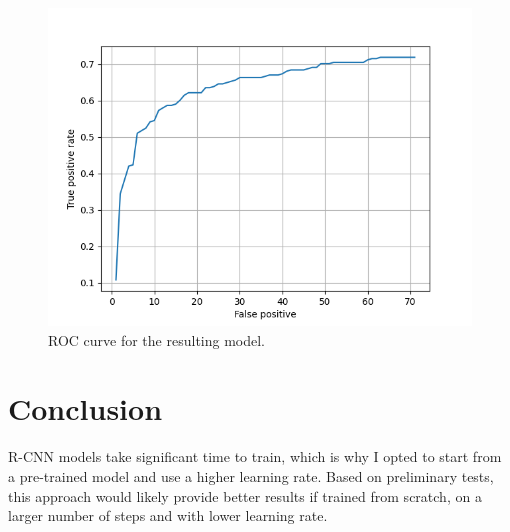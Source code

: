 \documentclass[9pt]{IEEEtran}
\begin{document}
\begin{figure}[h]
    \centering
    \includegraphics[width=1\columnwidth]{plot.png}
    \caption{ROC curve for the resulting model.}
    \label{fig:plot1}
\end{figure}

\section{Conclusion}

R-CNN models take significant time to train, which is why I opted to start from a pre-trained model and use a higher learning rate. Based on preliminary tests, this approach would likely provide better results if trained from scratch, on a larger number of steps and with lower learning rate.



\end{document}
